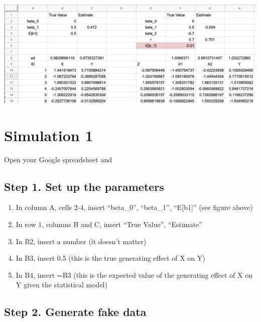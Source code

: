 \documentclass[]{book}
\providecommand{\tightlist}{%
  \setlength{\itemsep}{0pt}\setlength{\parskip}{0pt}}
\begin{document}
\includegraphics{images/ovb_fig1.png}

\section{Simulation 1}\label{simulation-1}

Open your Google spreadsheet and

\subsection{Step 1. Set up the
parameters}\label{step-1.-set-up-the-parameters}

\begin{enumerate}
\def\labelenumi{\arabic{enumi}.}
\tightlist
\item
  In column A, cells 2-4, insert ``beta\_0'', ``beta\_1'', ``E{[}b1{]}''
  (see figure above)
\item
  In row 1, columns B and C, insert ``True Value'', ``Estimate''
\item
  In B2, insert a number (it doesn't matter)
\item
  In B3, insert 0.5 (this is the true generating effect of X on Y)
\item
  In B4, insert =B3 (this is the expected value of the generating effect
  of X on Y given the statistical model)
\end{enumerate}

\subsection{Step 2. Generate fake
data}\label{step-2.-generate-fake-data}
\end{document}
